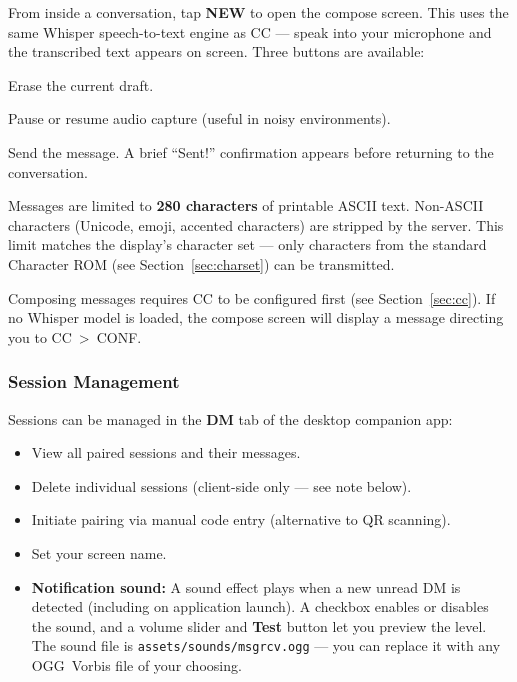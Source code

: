 \documentclass[10pt]{article}
\begin{document}
From inside a conversation, tap \textbf{NEW} to open the compose screen. This uses the same Whisper speech-to-text engine as CC --- speak into your microphone and the transcribed text appears on screen. Three buttons are available:

\begin{description}[style=nextline, leftmargin=1em, font=\bfseries\ttfamily, nosep]
  \item[CLEAR] Erase the current draft.
  \item[STOP / GO] Pause or resume audio capture (useful in noisy environments).
  \item[SEND] Send the message. A brief ``Sent!'' confirmation appears before returning to the conversation.
\end{description}

\noindent Messages are limited to \textbf{280 characters} of printable ASCII text. Non-ASCII characters (Unicode, emoji, accented characters) are stripped by the server. This limit matches the display's character set --- only characters from the standard Character ROM (see Section~\ref{sec:charset}) can be transmitted.

\begin{notebox}
  Composing messages requires CC to be configured first (see Section~\ref{sec:cc}). If no Whisper model is loaded, the compose screen will display a message directing you to CC~>~CONF.
\end{notebox}

\subsubsection{Session Management}

Sessions can be managed in the \textbf{DM} tab of the desktop companion app:

\begin{itemize}[leftmargin=2em, nosep]
  \item View all paired sessions and their messages.
  \item Delete individual sessions (client-side only --- see note below).
  \item Initiate pairing via manual code entry (alternative to QR scanning).
  \item Set your screen name.
  \item \textbf{Notification sound:} A sound effect plays when a new unread DM is detected (including on application launch). A checkbox enables or disables the sound, and a volume slider and \textbf{Test} button let you preview the level. The sound file is \texttt{assets/sounds/msgrcv.ogg} --- you can replace it with any OGG~Vorbis file of your choosing.
\end{itemize}
\end{document}
